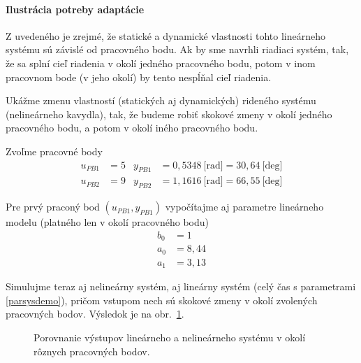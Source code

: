 \documentclass[a4paper, 10pt, ]{article}
\begin{document}
\paragraph{Ilustrácia potreby adaptácie}







Z uvedeného je zrejmé, že statické a dynamické vlastnosti tohto lineárneho systému sú závislé od pracovného bodu. Ak by sme navrhli riadiaci systém, tak, že sa splní cieľ riadenia v okolí jedného pracovného bodu, potom v inom pracovnom bode (v jeho okolí) by tento nespĺňal cieľ riadenia.

Ukážme zmenu vlastností (statických aj dynamických) rideného systému (nelineárneho kavydla), tak, že budeme robiť skokové zmeny v okolí jedného pracovného bodu, a potom v okolí iného pracovného bodu.

Zvoľme pracovné body
\begin{subequations}
    \begin{align}
        u_{PB1} &= 5 &       y_{PB1} &= 0,5348 \ \text{[rad]} = 30,64 \ \text{[deg]}\\
        u_{PB2} &= 9 &       y_{PB2} &= 1,1616 \ \text{[rad]} = 66,55 \ \text{[deg]}
    \end{align}
\end{subequations}

Pre prvý praconý bod $\left( u_{PB1}, y_{PB1} \right)$ vypočítajme aj parametre lineárneho modelu (platného len v okolí pracovného bodu)
\begin{subequations} \label{parsysdemo}
    \begin{align}
        b_0 &= 1 \\
        a_0 &= 8,44 \\
        a_1 &= 3,13
    \end{align}
\end{subequations}



Simulujme teraz aj nelineárny systém, aj lineárny systém (celý čas s parametrami \eqref{parsysdemo}), pričom vstupom nech sú skokové zmeny v okolí zvolených pracovných bodov. Výsledok je na obr.~\ref{figsc_ar05_Kyvadlo_ep1_1}.




\begin{figure}[!t]
	\centering

    \vspace{-3mm}


    \vspace{-2mm}

	\caption{Porovnanie výstupov lineárneho a nelineárneho systému v okolí rôznych pracovných bodov.}
	\label{figsc_ar05_Kyvadlo_ep1_1}

    \vspace{-2mm}

\end{figure}
\end{document}
